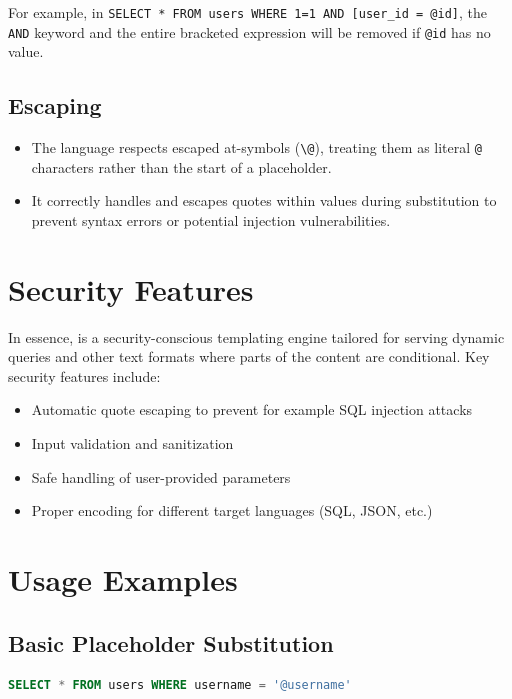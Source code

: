 For example, in \verb|SELECT * FROM users WHERE 1=1 AND [user_id = @id]|, the \texttt{AND} keyword and the entire bracketed expression will be removed if \texttt{@id} has no value.

\subsection{Escaping}

\begin{itemize}
\item The language respects escaped at-symbols (\texttt{\textbackslash @}), treating them as literal \texttt{@} characters rather than the start of a placeholder.
\item It correctly handles and escapes quotes within values during substitution to prevent syntax errors or potential injection vulnerabilities.
\end{itemize}

\section{Security Features}
\label{sec:wbpl-security}

In essence, \wbpl{} is a security-conscious templating engine tailored for serving dynamic queries and other text formats where parts of the content are conditional. Key security features include:

\begin{itemize}
\item Automatic quote escaping to prevent for example SQL injection attacks
\item Input validation and sanitization
\item Safe handling of user-provided parameters
\item Proper encoding for different target languages (SQL, JSON, etc.)
\end{itemize}

\section{Usage Examples}
\label{sec:wbpl-examples}

\subsection{Basic Placeholder Substitution}

\begin{lstlisting}[language=SQL,caption={Simple WBPL Substitution}]
SELECT * FROM users WHERE username = '@username'
\end{lstlisting}

